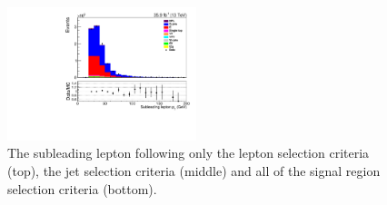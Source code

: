 \begin{figure}[ht]
\includegraphics[width=0.49\textwidth]{figs/background-estimation/plots/unblinded/prompt_mumu_ttbarInc/lep2Pt_NPL_mumu_wMass_mumu.pdf}
\caption{
The subleading lepton \pT following only the lepton selection criteria (top), the jet selection criteria (middle) and all of the signal region selection criteria (bottom).
}
\label{fig:SR_lep2Pt}
\end{figure}

